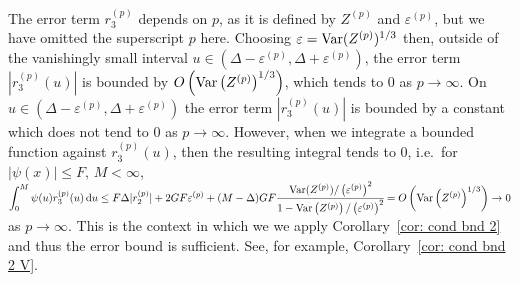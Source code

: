 


 
The error term \(r_3^{(p)}\) depends on \(p\), as it is defined by \(Z^{(p)}\) and \(\varepsilon^{(p)}\), but we have omitted the superscript \(p\) here. Choosing \(\varepsilon=\mathrm{Var}(Z^{(p)})^{1/3}\) then, outside of the vanishingly small interval \(u\in(\Delta-\varepsilon^{(p)},\Delta+\varepsilon^{(p)})\), the error term \(|r_3^{(p)}(u)|\) is bounded by \(O\left(\mathrm{Var}\left(Z^{(p)}\right)^{1/3}\right)\), which tends to 0 as \(p\to\infty\). On \(u\in(\Delta-\varepsilon^{(p)},\Delta+\varepsilon^{(p)})\) the error term \(|r_3^{(p)}(u)|\) is bounded by a constant which does not tend to \(0\) as \(p \to \infty\). However, when we integrate a bounded function against \(r_3^{(p)}(u)\), then the resulting integral tends to \(0\), i.e.~for \(|\psi(x)|\leq F, \, M<\infty\), \(\displaystyle \int_{0}^M \psi(u) r_3^{(p)}(u)\, \mathrm{d} u\leq F\Delta |r_2^{(p)}| + 2GF\varepsilon^{(p)} + (M-\Delta)GF\cfrac{\mathrm{Var}(Z^{(p)})/\left(\varepsilon^{(p)}\right)^2}{1-\mathrm{Var}\left(Z^{(p)}\right)/\left(\varepsilon^{(p)}\right)^2}=O\left(\mathrm{Var}\left(Z^{(p)}\right)^{1/3}\right)\to 0 \) as \(p\to\infty\). This is the context in which we we apply Corollary~\ref{cor: cond bnd 2} and thus the error bound is sufficient. See, for example, Corollary~\ref{cor: cond bnd 2 V}. 

